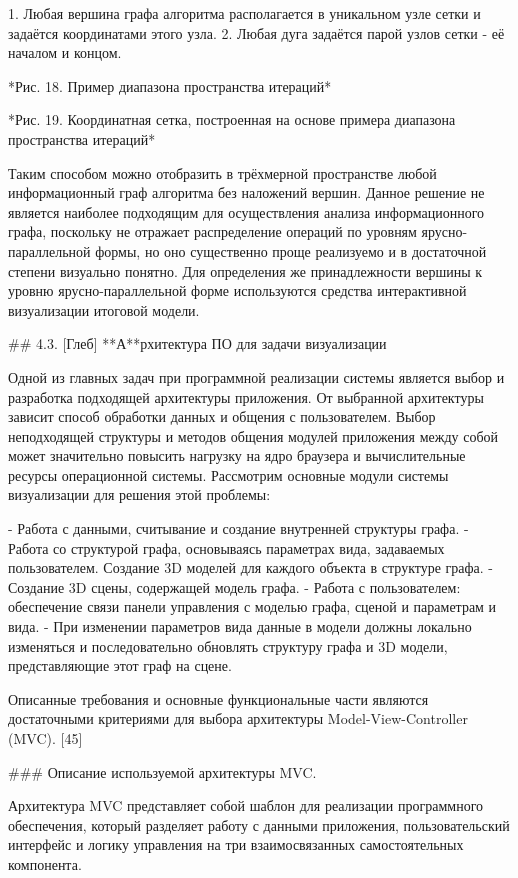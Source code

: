 1. Любая вершина графа алгоритма располагается в уникальном узле сетки и задаётся координатами этого узла.
2. Любая дуга задаётся парой узлов сетки - её началом и концом.


*Рис. 18. Пример диапазона пространства итераций*



*Рис. 19. Координатная сетка, построенная на основе примера диапазона пространства итераций*

Таким способом можно отобразить в трёхмерной пространстве любой информационный граф алгоритма без наложений вершин. Данное решение не является наиболее подходящим для осуществления анализа информационного графа, поскольку не отражает распределение операций по уровням ярусно-параллельной формы, но оно существенно проще реализуемо и в достаточной степени визуально понятно. Для определения же принадлежности вершины к уровню ярусно-параллельной форме используются средства интерактивной визуализации итоговой модели.

## 4.3. [Глеб] **А**рхитектура ПО для задачи визуализации

Одной из главных задач при программной реализации системы является выбор и разработка подходящей архитектуры приложения. От выбранной архитектуры зависит способ обработки данных и общения с пользователем. Выбор неподходящей структуры и методов общения модулей приложения между собой может значительно повысить нагрузку на ядро браузера и вычислительные ресурсы операционной системы. Рассмотрим основные модули системы визуализации для решения этой проблемы:

- Работа с данными, считывание и создание внутренней структуры графа.
- Работа со структурой графа, основываясь параметрах вида, задаваемых пользователем. Создание 3D моделей для каждого объекта в структуре графа.
- Создание 3D сцены, содержащей модель графа.
- Работа с пользователем: обеспечение связи панели управления с моделью графа, сценой и параметрам и вида.
- При изменении параметров вида данные в модели должны локально изменяться и последовательно обновлять структуру графа и 3D модели, представляющие этот граф на сцене.

Описанные требования и основные функциональные части являются достаточными критериями для выбора архитектуры Model-View-Controller (MVC). [45]

### Описание используемой архитектуры MVC.

Архитектура MVC представляет собой шаблон для реализации программного обеспечения, который разделяет работу с данными приложения, пользовательский интерфейс и логику управления на три взаимосвязанных самостоятельных компонента.

